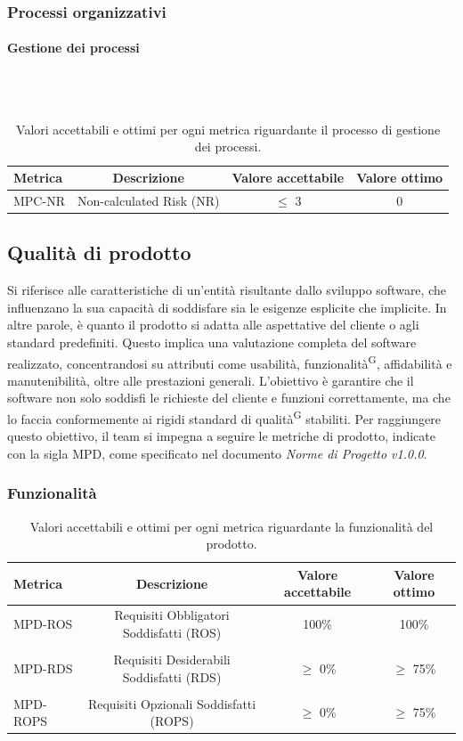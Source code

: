 \documentclass[8pt]{article}
\newcommand{\glossterm}[1]{#1\textsuperscript{G}} %
\newcommand{\subsubsubsection}[1]{\paragraph{#1}\mbox{}\\\\}
\begin{document}
\subsubsection{Processi organizzativi}
\subsubsubsection{Gestione dei processi}
\begin{table}[H]	
	\centering
	\begin{tabular}{lccc}
		\toprule
		\textbf{Metrica}& \textbf{Descrizione} & \textbf{Valore accettabile} & \textbf{Valore ottimo} \\
		\midrule
		MPC-NR & Non-calculated Risk (NR) & $\leq$ 3 & 0\\
		\bottomrule
	\end{tabular}
	\caption{Valori accettabili e ottimi per ogni metrica riguardante il processo di gestione dei processi.}
	\label{table:Valori accettabili e ottimi per ogni metrica riguardante il processo di gestione dei processi.}
\end{table}
\subsection{Qualità di prodotto}
Si riferisce alle caratteristiche di un'entità risultante dallo sviluppo software, che influenzano la sua capacità di soddisfare sia le esigenze esplicite che implicite. In altre parole, è quanto il prodotto si adatta alle aspettative del cliente o agli standard predefiniti. Questo implica una valutazione completa del software realizzato, concentrandosi su attributi come usabilità, \glossterm{funzionalità}, affidabilità e manutenibilità, oltre alle prestazioni generali. L'obiettivo è garantire che il software non solo soddisfi le richieste del cliente e funzioni correttamente, ma che lo faccia conformemente ai rigidi standard di \glossterm{qualità} stabiliti. Per raggiungere questo obiettivo, il team si impegna a seguire le metriche di prodotto, indicate con la sigla MPD, come specificato nel documento \textit{Norme di Progetto v1.0.0}.
\subsubsection{Funzionalità}
\begin{table}[H]	
	\centering
	\begin{tabular}{lccc}
		\toprule
		\textbf{Metrica}& \textbf{Descrizione} & \textbf{Valore accettabile} & \textbf{Valore ottimo} \\
		\midrule
		MPD-ROS& Requisiti Obbligatori Soddisfatti (ROS) & 100\% & 100\%\\\\
		MPD-RDS & Requisiti Desiderabili Soddisfatti (RDS) & $\geq$ 0\% & $\geq$ 75\% \\\\
		MPD-ROPS & Requisiti Opzionali Soddisfatti (ROPS) & $\geq$ 0\% & $\geq$ 75\% \\
		\bottomrule
	\end{tabular}
	\caption{Valori accettabili e ottimi per ogni metrica riguardante la funzionalità del prodotto.}
	\label{table:Valori accettabili e ottimi per ogni metrica riguardante la funzionalità del prodotto.}
\end{table}
\end{document}
